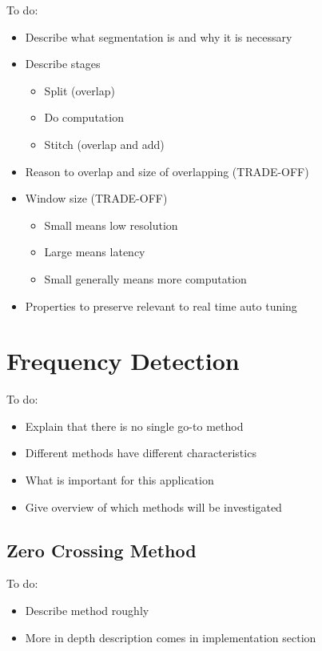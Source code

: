 \color{red}
To do:
\begin{itemize}
	\item Describe what segmentation is and why it is necessary
	\item Describe stages
	\begin{itemize}
		\item Split (overlap)
		\item Do computation
		\item Stitch (overlap and add)
	\end{itemize}
	\item Reason to overlap and size of overlapping (TRADE-OFF)
	\item Window size (TRADE-OFF)
	\begin{itemize}
		\item Small means low resolution
		\item Large means latency
		\item Small generally means more computation
	\end{itemize}
	\item Properties to preserve relevant to real time auto tuning
\end{itemize}
\color{black}

\section{Frequency Detection}

\color{red}
To do:
\begin{itemize}
	\item Explain that there is no single go-to method
	\item Different methods have different characteristics
	\item What is important for this application
	\item Give overview of which methods will be investigated
\end{itemize}
\color{black}

\subsection{Zero Crossing Method}

\color{red}
To do:
\begin{itemize}
	\item Describe method roughly
	\item More in depth description comes in implementation section
\end{itemize}
\color{black}

